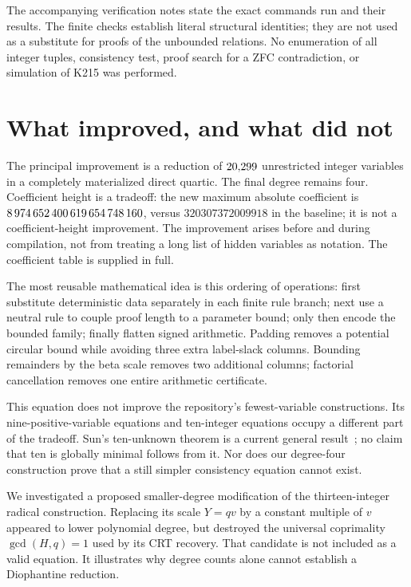 \documentclass[11pt,a4paper]{article}
\theoremstyle{definition}\newtheorem{definition}[theorem]{Definition}
\theoremstyle{remark}\newtheorem{remark}[theorem]{Remark}
\numberwithin{equation}{section}
\begin{document}
The accompanying verification notes state the exact commands run and
their results. The finite checks establish literal structural identities;
they are not used as a substitute for proofs of the unbounded relations.
No enumeration of all integer tuples, consistency test, proof search for
a ZFC contradiction, or simulation of K215 was performed.

\section{What improved, and what did not}

The principal improvement is a reduction of \(20{,}299\) unrestricted
integer variables in a completely materialized direct quartic. The
final degree remains four. Coefficient height is a tradeoff: the new
maximum absolute coefficient is \(8\,974\,652\,400\,619\,654\,748\,160\), versus
\(320307372009918\) in the baseline; it is not a coefficient-height
improvement. The improvement arises before and during
compilation, not from treating a long list of hidden variables as
notation. The coefficient table is supplied in full.

The most reusable mathematical idea is this ordering of operations:
first substitute deterministic data separately in each finite rule
branch; next use a neutral rule to couple proof length to a parameter
bound; only then encode the bounded family; finally flatten signed
arithmetic. Padding removes a potential circular bound while avoiding
three extra label-slack columns. Bounding remainders by the beta scale
removes two additional columns; factorial cancellation removes one
entire arithmetic certificate.

This equation does not improve the repository's fewest-variable
constructions. Its nine-positive-variable equations and ten-integer
equations occupy a different part of the tradeoff. Sun's ten-unknown
theorem is a current general result~\cite{sun}; no claim that ten is
globally minimal follows from it. Nor does our degree-four construction
prove that a still simpler consistency equation cannot exist.

We investigated a proposed smaller-degree modification of the
thirteen-integer radical construction. Replacing its scale \(Y=qv\)
by a constant multiple of \(v\) appeared to lower polynomial degree,
but destroyed the universal coprimality \(\gcd(H,q)=1\) used by its CRT
recovery. That candidate is not included as a valid equation. It
illustrates why degree counts alone cannot establish a Diophantine
reduction.
\end{document}
